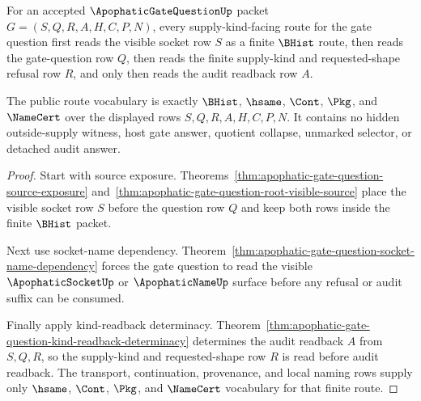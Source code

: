 \begin{theorem}
\label{thm:apophatic-gate-question-supply-kind-route-totality}
For an accepted $\ApophaticGateQuestionUp$ packet $G=(S,Q,R,A,H,C,P,N)$, every supply-kind-facing route for the gate question first reads the visible socket row $S$ as a finite $\BHist$ route, then reads the gate-question row $Q$, then reads the finite supply-kind and requested-shape refusal row $R$, and only then reads the audit readback row $A$.

The public route vocabulary is exactly $\BHist$, $\hsame$, $\Cont$, $\Pkg$, and $\NameCert$ over the displayed rows $S,Q,R,A,H,C,P,N$. It contains no hidden outside-supply witness, host gate answer, quotient collapse, unmarked selector, or detached audit answer.
\end{theorem}
\begin{proof}
Start with source exposure. Theorems~\ref{thm:apophatic-gate-question-source-exposure} and~\ref{thm:apophatic-gate-question-root-visible-source} place the visible socket row $S$ before the question row $Q$ and keep both rows inside the finite $\BHist$ packet.

Next use socket-name dependency. Theorem~\ref{thm:apophatic-gate-question-socket-name-dependency} forces the gate question to read the visible $\ApophaticSocketUp$ or $\ApophaticNameUp$ surface before any refusal or audit suffix can be consumed.

Finally apply kind-readback determinacy. Theorem~\ref{thm:apophatic-gate-question-kind-readback-determinacy} determines the audit readback $A$ from $S,Q,R$, so the supply-kind and requested-shape row $R$ is read before audit readback. The transport, continuation, provenance, and local naming rows supply only $\hsame$, $\Cont$, $\Pkg$, and $\NameCert$ vocabulary for that finite route.
\end{proof}

